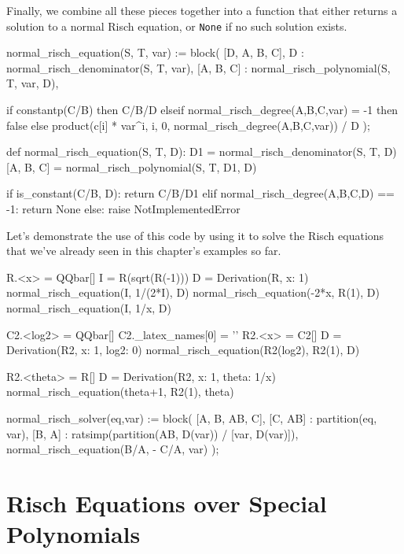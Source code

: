 Finally, we combine all these pieces together into a function that
either returns a solution to a normal Risch equation, or {\tt None}
if no such solution exists.

\begin{maximacode}
normal_risch_equation(S, T, var) := block(
   [D, A, B, C],
   D : normal_risch_denominator(S, T, var),
   [A, B, C] : normal_risch_polynomial(S, T, var, D),

   if constantp(C/B) then C/B/D
   elseif normal_risch_degree(A,B,C,var) = -1
      then false
   else product(c[i] * var^i, i, 0,
                normal_risch_degree(A,B,C,var))
        / D
);
\end{maximacode}

\begin{sagecommon}
def normal_risch_equation(S, T, D):
  D1 = normal_risch_denominator(S, T, D)
  [A, B, C] = normal_risch_polynomial(S, T, D1, D)

  if is_constant(C/B, D):
     return C/B/D1
  elif normal_risch_degree(A,B,C,D) == -1:
     return None
  else:
     raise NotImplementedError
\end{sagecommon}

Let's demonstrate the use of this code by using it to solve the Risch
equations that we've already seen in this chapter's examples so far.

\begin{sageblock}
R.<x> = QQbar[]
I = R(sqrt(R(-1)))
D = Derivation(R, {x: 1})
normal_risch_equation(I, 1/(2*I), D)
normal_risch_equation(-2*x, R(1), D)
normal_risch_equation(I, 1/x, D)

C2.<log2> = QQbar[]
C2._latex_names[0] = '{}'
R2.<x> = C2[]
D = Derivation(R2, {x: 1, log2: 0})
normal_risch_equation(R2(log2), R2(1), D)

R2.<theta> = R[]
D = Derivation(R2, {x: 1, theta: 1/x})
normal_risch_equation(theta+1, R2(1), theta)
\end{sageblock}

\begin{maximacommon}
normal_risch_solver(eq,var) := block(
   [A, B, AB, C],
   [C, AB] : partition(eq, var),
   [B, A] : ratsimp(partition(AB, D(var))
          / [var, D(var)]),
   normal_risch_equation(B/A, - C/A, var)
);
\end{maximacommon}

\vfill\eject
\section{Risch Equations over Special Polynomials}

